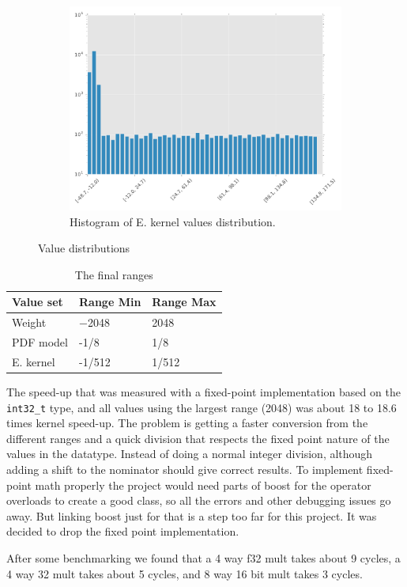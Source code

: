 \documentclass[final]{article}
\begin{document}
\begin{figure}[H]
\begin{subfigure}[b]{0.32\textwidth}
        \includegraphics[width=\textwidth]{resources/histogramE}
        \caption{Histogram of E. kernel values distribution.}
    \end{subfigure}
    \caption{Value distributions}
    \label{fig:value-distributions}
\end{figure}


\begin{table}[H]
    \centering
    \caption{The final ranges}
    \label{tab:final-ranges}
    \begin{tabular}{lll}
        \toprule
        \textbf{Value set} & \textbf{Range Min} & \textbf{Range Max} \\
        \midrule
        Weight      &  \num{-2048}  &  \num{2048}     \\
        PDF model   &  \num{-1/8}   &  \num{1/8}      \\
        E. kernel      &  \num{-1/512} &  \num{1/512}    \\
        \bottomrule
    \end{tabular}
\end{table}

The speed-up that was measured with a fixed-point implementation based on the \texttt{int32\_t} type, and all values using the largest range (\num{2048}) was about \num{18} to \num{18.6} times kernel speed-up.
The problem is getting a faster conversion from the different ranges and a quick division that respects the fixed point nature of the values in the  datatype.
Instead of doing a normal integer division, although adding a shift to the nominator should give correct results.
To implement fixed-point math properly the project would need parts of boost for the operator overloads to create a good class, so all the errors and other debugging issues go away.
But linking boost just for that is a step too far for this project.
It was decided to drop the fixed point implementation.

After some benchmarking we found that a 4 way f32 mult takes about 9 cycles, a 4 way 32 mult takes about 5 cycles, and 8 way 16 bit mult takes 3 cycles.
\end{document}
